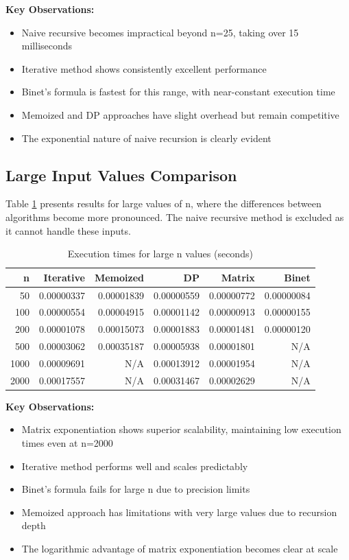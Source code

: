 \documentclass[12pt]{article}
\begin{document}
\textbf{Key Observations:}
\begin{itemize}
    \item Naive recursive becomes impractical beyond n=25, taking over 15 milliseconds
    \item Iterative method shows consistently excellent performance
    \item Binet's formula is fastest for this range, with near-constant execution time
    \item Memoized and DP approaches have slight overhead but remain competitive
    \item The exponential nature of naive recursion is clearly evident
\end{itemize}

\subsection{Large Input Values Comparison}

Table \ref{tab:large_comparison} presents results for large values of n, where the differences between algorithms become more pronounced. The naive recursive method is excluded as it cannot handle these inputs.

\begin{table}[H]
\centering
\caption{Execution times for large n values (seconds)}
\label{tab:large_comparison}
\small
\begin{tabular}{@{}rrrrrr@{}}
\toprule
\textbf{n} & \textbf{Iterative} & \textbf{Memoized} & \textbf{DP} & \textbf{Matrix} & \textbf{Binet} \\ 
\midrule
50   & 0.00000337 & 0.00001839 & 0.00000559 & 0.00000772 & 0.00000084 \\ 
100  & 0.00000554 & 0.00004915 & 0.00001142 & 0.00000913 & 0.00000155 \\ 
200  & 0.00001078 & 0.00015073 & 0.00001883 & 0.00001481 & 0.00000120 \\ 
500  & 0.00003062 & 0.00035187 & 0.00005938 & 0.00001801 & N/A \\ 
1000 & 0.00009691 & N/A        & 0.00013912 & 0.00001954 & N/A \\ 
2000 & 0.00017557 & N/A        & 0.00031467 & 0.00002629 & N/A \\ 
\bottomrule
\end{tabular}
\end{table}

\textbf{Key Observations:}
\begin{itemize}
    \item Matrix exponentiation shows superior scalability, maintaining low execution times even at n=2000
    \item Iterative method performs well and scales predictably
    \item Binet's formula fails for large n due to precision limits
    \item Memoized approach has limitations with very large values due to recursion depth
    \item The logarithmic advantage of matrix exponentiation becomes clear at scale
\end{itemize}
\end{document}
